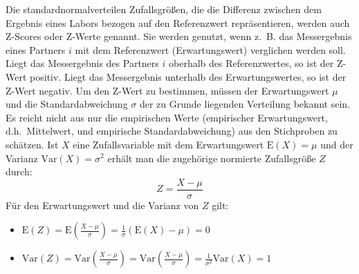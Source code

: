Die standardnormalverteilen Zufallsgrößen, die die Differenz zwischen dem Ergebnis eines Labors bezogen auf den Referenzwert repräsentieren, werden auch Z-Scores oder Z-Werte genannt. Sie werden genutzt, wenn z.~B. das Messergebnis eines
Partners $i$ mit dem Referenzwert (Erwartungswert) verglichen werden soll.
Liegt das Messergebnis des Partners $i$ oberhalb des Referenzwertes, so ist der Z-Wert positiv.
Liegt das Messergebnis  unterhalb des Erwartungswertes, so ist der Z-Wert negativ. 
Um den Z-Wert zu bestimmen, müssen der Erwartungswert $\mu$ und die 
Standardabweichung $\sigma$ der zu Grunde liegenden Verteilung 
bekannt sein. Es reicht nicht aus nur die empirischen Werte (empirischer Erwartungswert, d.h.\
Mittelwert, und empirische Standardabweichung) aus den Stichproben zu schätzen.
Ist $X$ eine Zufallsvariable mit dem Erwartungswert $\mathrm{E}(X)=\mu$ und 
der Varianz $\mathrm{Var}(X) = \sigma^2$ erhält man die zugehörige normierte Zufallsgröße $Z$ durch:
\begin{equation}
Z=\frac{X-\mu}{\sigma}
\end{equation}
Für den Erwartungswert und die Varianz von $Z$ gilt:
\begin{itemize}
	\item $\mathrm{E}(Z) = \mathrm{E}\left( \frac{X-\mu}{\sigma} \right) =
	\frac{1}{\sigma} (\mathrm{E}(X) -\mu) = 0$
	\item $\mathrm{Var}(Z) = \mathrm{Var} \left(\frac{X-\mu}{\sigma} \right) = 
	\mathrm{Var} \left(\frac{X-\mu}{\sigma} \right) = 
	\frac{1}{\sigma^2} \mathrm{Var}(X) = 1$
\end{itemize}

